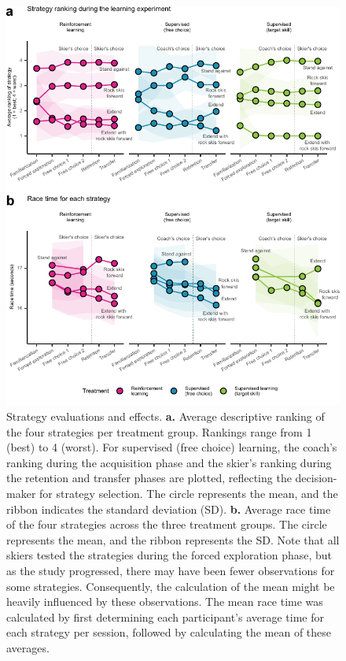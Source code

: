 \documentclass{article}
\begin{document}
\begin{figure}[H]
\centering
\includegraphics[]{figures/figure_ranking_average_3.pdf}
\caption{Strategy evaluations and effects. \textbf{a. }Average descriptive ranking of the four strategies per treatment group. Rankings range from 1 (best) to 4 (worst). For supervised (free choice) learning, the coach's ranking during the acquisition phase and the skier's ranking during the retention and transfer phases are plotted, reflecting the decision- maker for strategy selection. The circle represents the mean, and the ribbon indicates the standard deviation (SD). \textbf{b.} Average race time of the four strategies across the three treatment groups. The circle represents the mean, and the ribbon represents the SD. Note that all skiers tested the strategies during the forced exploration phase, but as the study progressed, there may have been fewer observations for some strategies. Consequently, the calculation of the mean might be heavily influenced by these observations. The mean race time was calculated by first determining each participant's average time for each strategy per session, followed by calculating the mean of these averages.}\label{fig: rank}
\end{figure}
\end{document}
